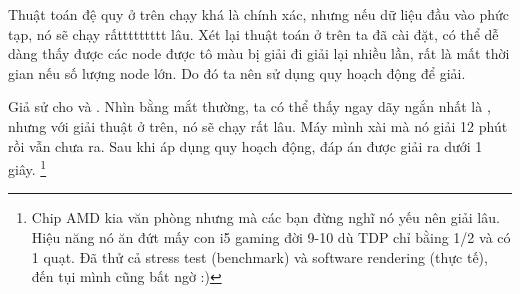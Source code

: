 \documentclass[main.tex]{subfiles}
\begin{document}
Thuật toán đệ quy ở trên chạy khá là chính xác, nhưng nếu dữ liệu đầu vào phức tạp, nó sẽ chạy rấttttttttt lâu.
Xét lại thuật toán ở trên ta đã cài đặt, có thể dễ dàng thấy được các node được tô màu bị giải đi giải lại nhiều lần, rất là mất thời gian nếu số lượng node lớn. Do đó ta nên sử dụng quy hoạch động để giải. 

\begin{center}
\end{center}

Giả sử cho  và . Nhìn bằng mắt thường, ta có thể thấy ngay dãy ngắn nhất là , nhưng với giải thuật ở trên, nó sẽ chạy rất lâu. Máy mình xài  mà nó giải 12 phút rồi vẫn chưa ra. Sau khi áp dụng quy hoạch động, đáp án được giải ra dưới 1 giây.
\footnote{\scriptsize Chip AMD kia văn phòng nhưng mà các bạn đừng nghĩ nó yếu nên giải lâu. Hiệu năng nó ăn đứt mấy con i5 gaming đời 9-10 dù TDP chỉ bằing 1/2 và có 1 quạt. Đã thử cả stress test (benchmark) và software rendering (thực tế), đến tụi mình cũng bất ngờ :)}
\end{document}
